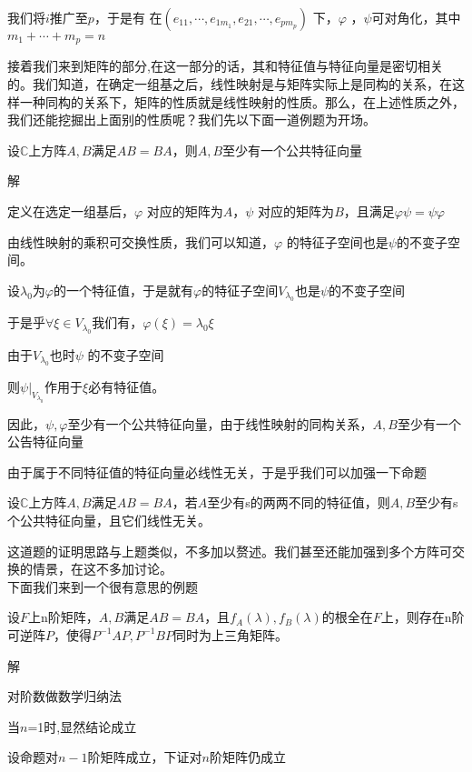 \documentclass[lang=cn,10pt]{elegantbook}
\begin{document}
我们将$i$推广至$p$，于是有
	在$\left( e_{11},\cdots ,e_{1m_1},e_{21},\cdots ,e_{pm_p} \right)$ 下，$\varphi$ ，$\psi $可对角化，其中$m_1+\cdots +m_p=n$

接着我们来到矩阵的部分,在这一部分的话，其和特征值与特征向量是密切相关的。我们知道，在确定一组基之后，线性映射是与矩阵实际上是同构的关系，在这样一种同构的关系下，矩阵的性质就是线性映射的性质。那么，在上述性质之外，我们还能挖掘出上面别的性质呢？我们先以下面一道例题为开场。

\begin{example}
	设$\mathbb{C} $上方阵$A,B$满足$AB=BA$，则$A,B$至少有一个公共特征向量
\end{example}
解

	定义在选定一组基后，$\varphi$ 对应的矩阵为$A$，$\psi$ 对应的矩阵为$B$，且满足$\varphi \psi =\psi \varphi$
	
	由线性映射的乘积可交换性质，我们可以知道，$\varphi$ 的特征子空间也是$\psi $的不变子空间。

	设$\lambda_0$为$\varphi $的一个特征值，于是就有$\varphi $的特征子空间$V_{\lambda _0}$也是$\psi $的不变子空间

	于是乎$\forall \xi \in V_{\lambda_{0}}$我们有，$\varphi (\xi )=\lambda_{0}\xi$ 

	由于$V_{\lambda_{0}}$也时$\psi$ 的不变子空间
	
	则$\psi|_{V_{\lambda_{0}}}$作用于$\xi$必有特征值。
	
	因此，$\psi,\varphi $至少有一个公共特征向量，由于线性映射的同构关系，$A,B$至少有一个公告特征向量
	
	
	由于属于不同特征值的特征向量必线性无关，于是乎我们可以加强一下命题
	\begin{example}
		设$\mathbb{C} $上方阵$A,B$满足$AB=BA$，若$A$至少有s的两两不同的特征值，则$A,B$至少有s个公共特征向量，且它们线性无关。
	\end{example}
	这道题的证明思路与上题类似，不多加以赘述。我们甚至还能加强到多个方阵可交换的情景，在这不多加讨论。
	~\\
	
	下面我们来到一个很有意思的例题
\begin{example}
	设$F$上n阶矩阵，$A,B$满足$AB=BA$，且$f_A\left( \lambda \right) ,f_B\left( \lambda \right) $的根全在$F$上，则存在n阶可逆阵$P$，使得$P^{-1}AP,P^{-1}BP$同时为上三角矩阵。
\end{example}
解

对阶数做数学归纳法

当$n$=1时,显然结论成立

设命题对$n-1$阶矩阵成立，下证对$n$阶矩阵仍成立
\end{document}
